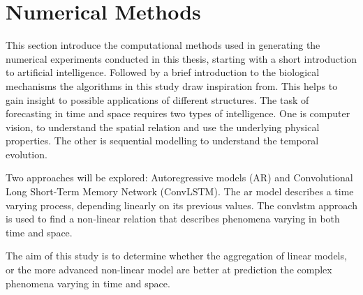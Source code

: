 \setcounter{chapter}{2}
\chapter{Numerical Methods} \label{ch:num_methods}
This section introduce the computational methods used in generating the numerical experiments conducted in this thesis, starting with a short introduction to artificial intelligence. Followed by a brief introduction to the biological mechanisms the algorithms in this study draw inspiration from. This helps to gain insight to possible applications of different structures.
The task of forecasting in time and space requires two types of intelligence. One is computer vision, to understand the spatial relation and use the underlying physical properties. The other is sequential modelling to understand the temporal evolution.

Two approaches will be explored: Autoregressive models (AR) and Convolutional Long Short-Term Memory Network (ConvLSTM). The \acrshort{ar} model describes a time varying process, depending linearly on its previous values. The \acrshort{convlstm} approach is used to find a non-linear relation that describes phenomena varying in both time and space.

The aim of this study is to determine whether the aggregation of linear models, or the more advanced non-linear model are better at prediction the complex phenomena varying in time and space.


